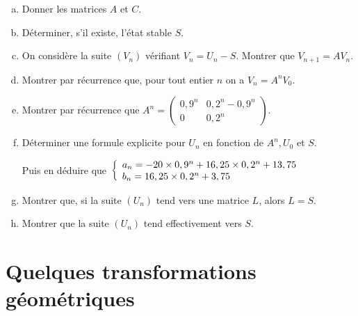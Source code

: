 \documentclass[10pt,a4paper]{article}
\begin{document}
\begin{enumerate}[a.]
\item Donner les matrices $A$ et $C$.
\item Déterminer, s'il existe, l'état stable $S$.
\item On considère la suite $(V_n)$ vérifiant $V_n=U_n-S$. Montrer que $V_{n+1}=AV_n$.
\item Montrer par récurrence que, pour tout entier $n$ on a $V_n=A^nV_0$.
\item Montrer par récurrence que $A^n=\begin{pmatrix} 0,9^n & 0,2^n-0,9^n\\0 & 0,2 ^n \end{pmatrix}$.
\item Déterminer une formule explicite pour $U_n$ en fonction de $A^n,U_0$ et $S$.

Puis en déduire que $\left\lbrace \begin{array}{l} a_n=-20 \times 0,9^n + 16,25 \times 0,2^n + 13,75 \\ b_n= 16,25 \times 0,2^n + 3,75 \end{array} \right.$

\item Montrer que, si la suite $(U_n)$ tend vers une matrice $L$, alors $L=S$.
\item Montrer que la suite $(U_n)$ tend effectivement vers $S$.
\end{enumerate}


\section{Quelques transformations géométriques}
\end{document}
